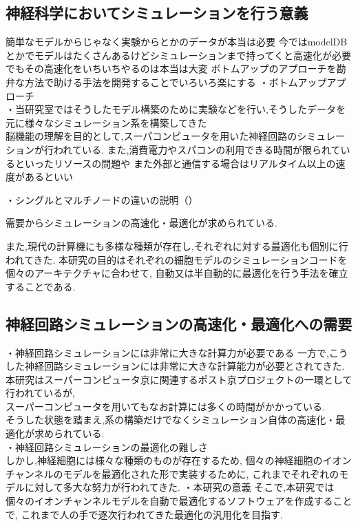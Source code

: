 \subsection{神経科学においてシミュレーションを行う意義}
簡単なモデルからじゃなく実験からとかのデータが本当は必要
今ではmodelDBとかでモデルはたくさんあるけどシミュレーションまで持ってくと高速化が必要
でもその高速化をいちいちやるのは本当は大変
ボトムアップのアプローチを勘弁な方法で助ける手法を開発することでいろいろ楽にする
・ボトムアップアプローチ\\

・当研究室ではそうしたモデル構築のために実験などを行い,そうしたデータを元に様々なシミュレーション系を構築してきた\\
脳機能の理解を目的として,スーパコンピュータを用いた神経回路のシミュレーションが行われている.
また,消費電力やスパコンの利用できる時間が限られているといったリソースの問題や
また外部と通信する場合はリアルタイム以上の速度があるといい


・シングルとマルチノードの違いの説明（）

需要からシミュレーションの高速化・最適化が求められている.

また,現代の計算機にも多様な種類が存在し,それぞれに対する最適化も個別に行われてきた.
本研究の目的はそれぞれの細胞モデルのシミュレーションコードを個々のアーキテクチャに合わせて,
自動又は半自動的に最適化を行う手法を確立することである.

\subsection{神経回路シミュレーションの高速化・最適化への需要}
・神経回路シミュレーションには非常に大きな計算力が必要である
一方で,こうした神経回路シミュレーションには非常に大きな計算能力が必要とされてきた.\\
本研究はスーパーコンピュータ京に関連するポスト京プロジェクトの一環として行われているが,\\
スーパーコンピュータを用いてもなお計算には多くの時間がかかっている.\\
そうした状態を踏まえ,系の構築だけでなくシミュレーション自体の高速化・最適化が求められている.\\
・神経回路シミュレーションの最適化の難しさ\\
しかし,神経細胞には様々な種類のものが存在するため,
個々の神経細胞のイオンチャンネルのモデルを最適化された形で実装するために,
これまでそれぞれのモデルに対して多大な努力が行われてきた.
・本研究の意義
そこで,本研究では個々のイオンチャンネルモデルを自動で最適化するソフトウェアを作成することで,
これまで人の手で逐次行われてきた最適化の汎用化を目指す.
